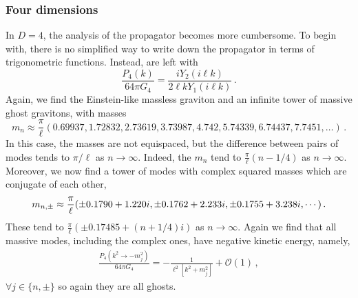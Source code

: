 \documentclass[11pt]{article}
\begin{document}
{\subsubsection{Four dimensions}
In $D=4$, the analysis of the propagator becomes more cumbersome. To begin with, there is no simplified way to write down the propagator in terms of trigonometric functions. Instead, are left with
\begin{equation}
\frac{P_{4}(k)}{64 \pi G_4}= \frac{i Y_{2}(i \ell k)}{2 \ell k Y_{1}(i \ell k)}\,.
\end{equation}
 Again, we find the Einstein-like massless graviton and an infinite tower of massive ghost gravitons, with masses
 \begin{equation}
 m_n\approx \frac{\pi}{\ell} (0.69937, 1.72832, 2.73619, 3.73987, 4.742, 5.74339, 6.74437, 7.7451,\dots)\,.
 \end{equation}
In this case, the masses are not equispaced, but the difference between pairs of modes tends to $\pi/\ell$ as $n \rightarrow \infty$. Indeed, the $m_n$ tend to $\frac{\pi}{\ell} \left( n - 1/4 \right)$ as $n \rightarrow \infty$. 
Moreover, we now find a tower of modes with complex squared masses which are conjugate of each other,
 \begin{equation}
 m_{n, \rm \pm} \approx \frac{\pi}{\ell} (\pm 0.1790 + 1.220 i, \pm 0.1762 + 2.233 i, \pm 0.1755 + 3.238 i, \cdots) \,.
 \end{equation}
These tend to $\frac{\pi}{\ell} (\pm 0.17485 + (n+1/4) i)$ as $n \rightarrow \infty$.
Again we find that all massive modes, including the complex ones, have negative kinetic energy, namely,
 \begin{align}
\frac{P_{4}(k^2\rightarrow -m_j^2  )}{64\pi G_4}=-\frac{1}{\ell^2 [k^2+m_j^2]}+\mathcal{O}(1) \, ,
\end{align}
$\forall j \in \{n, \pm \}$ so again they are all ghosts. 

}
\end{document}
